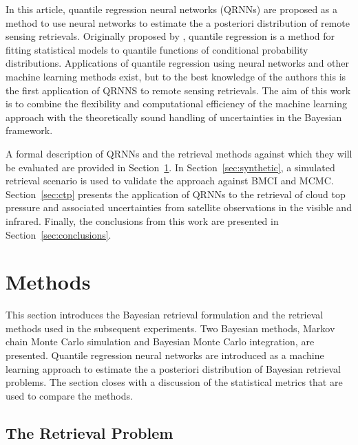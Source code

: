 \documentclass[journal abbreviation, manuscript]{copernicus}
\begin{document}
In this article, quantile regression neural networks (QRNNs) are proposed as a
method to use neural networks to estimate the a posteriori distribution of
remote sensing retrievals. Originally proposed by \citet{koenker_bassett},
quantile regression is a method for fitting statistical models to quantile
functions of conditional probability distributions. Applications of quantile
regression using neural networks \citep{cannon} and other machine learning
methods \citep{meinshausen} exist, but to the best knowledge of the authors this
is the first application of QRNNS to remote sensing retrievals. The aim of this
work is to combine the flexibility and computational efficiency of the machine
learning approach with the theoretically sound handling of uncertainties in the
Bayesian framework.

A formal description of QRNNs and the retrieval methods against which they will
be evaluated are provided in Section~\ref{sec:methods}. In
Section~\ref{sec:synthetic}, a simulated retrieval scenario is used to validate
the approach against BMCI and MCMC. Section~\ref{sec:ctp} presents the
application of QRNNs to the retrieval of cloud top pressure and associated
uncertainties from satellite observations in the visible and infrared. Finally,
the conclusions from this work are presented in Section~\ref{sec:conclusions}.

\section{Methods}
\label{sec:methods}

This section introduces the Bayesian retrieval formulation and the retrieval
methods used in the subsequent experiments. Two Bayesian methods, Markov chain
Monte Carlo simulation and Bayesian Monte Carlo integration, are presented.
Quantile regression neural networks are introduced as a machine learning
approach to estimate the a posteriori distribution of Bayesian retrieval
problems. The section closes with a discussion of the statistical metrics that
are used to compare the methods.

\subsection{The Retrieval Problem}
\end{document}

